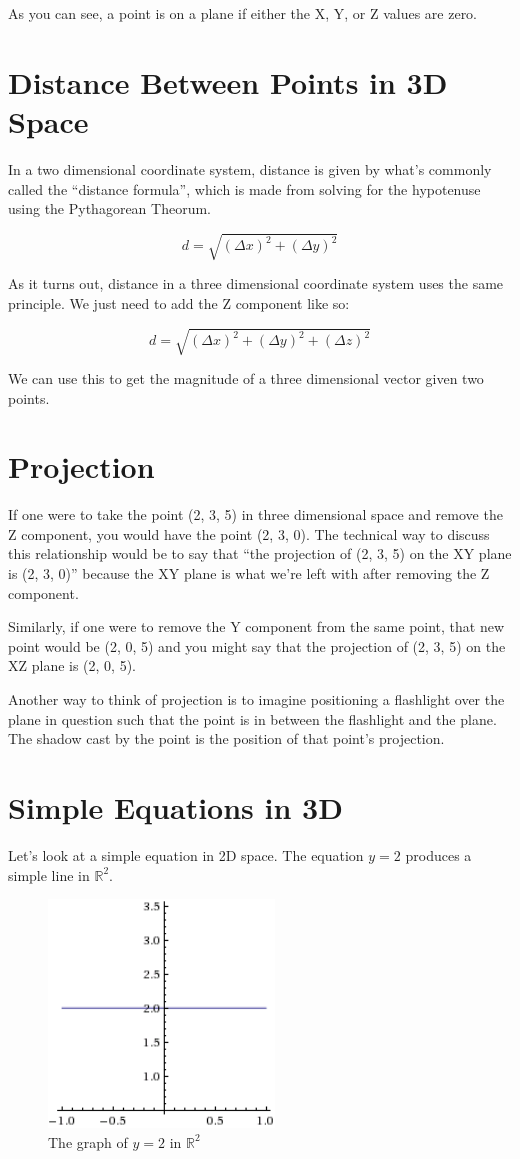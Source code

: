 \documentclass{article}
\begin{document}
As you can see, a point is on a plane if either the X, Y, or Z values are zero.

\section{Distance Between Points in 3D Space}
In a two dimensional coordinate system, distance is given by what's commonly
called the ``distance formula'', which is made from solving for the hypotenuse
using the Pythagorean Theorum.

$$d = \sqrt{(\Delta x)^2 + (\Delta y)^2}$$

As it turns out, distance in a three dimensional coordinate system uses the
same principle. We just need to add the Z component like so:

$$d = \sqrt{(\Delta x)^2 + (\Delta y)^2 + (\Delta z)^2}$$

We can use this to get the magnitude of a three dimensional vector given two
points.

\section{Projection}
If one were to take the point (2, 3, 5) in three dimensional space and remove
the Z component, you would have the point (2, 3, 0). The technical way to
discuss this relationship would be to say that ``the projection of (2, 3, 5) on
the XY plane is (2, 3, 0)'' because the XY plane is what we're left with after
removing the Z component.

Similarly, if one were to remove the Y component from the same point, that new
point would be (2, 0, 5) and you might say that the projection of (2, 3, 5) on
the XZ plane is (2, 0, 5).

Another way to think of projection is to imagine positioning a flashlight over
the plane in question such that the point is in between the flashlight and the
plane. The shadow cast by the point is the position of that point's projection.

\section{Simple Equations in 3D}
Let's look at a simple equation in 2D space. The equation $y=2$ produces a
simple line in $\mathbb{R}^2$.

\begin{figure}[H]
	\centering
	\includegraphics[width=6cm]{y=2-2d}
	\caption{The graph of $y=2$ in $\mathbb{R}^2$}
	\label{fig:y=2-2d}
\end{figure}
\end{document}
